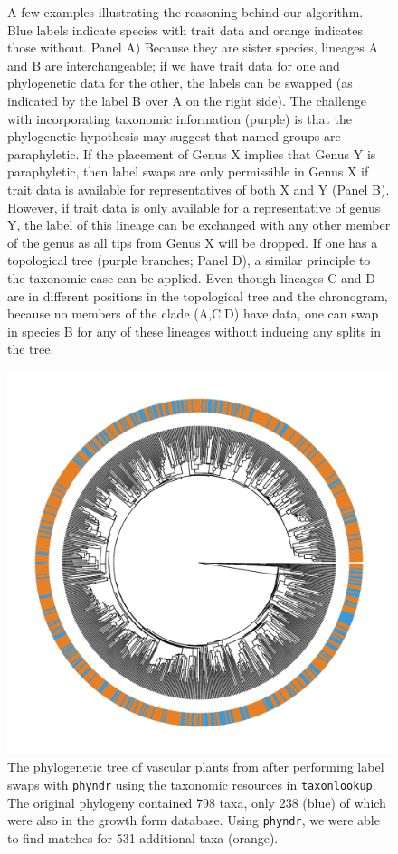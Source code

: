\documentclass[a4paper,11pt]{article}
\newcommand{\phyndr}{\tt phyndr}
\newcommand{\taxonlookup}{\tt taxonlookup}
\begin{document}
\addtocounter{figure}{-1}
\begin{figure} [p]
  \caption{A few examples illustrating the reasoning behind our algorithm. Blue labels indicate species with trait data and orange indicates those without. Panel A) Because they are sister species, lineages A and B are interchangeable; if we have trait data for one and phylogenetic data for the other, the labels can be swapped (as indicated by the label B over A on the right side). The challenge with incorporating taxonomic information (purple) is that the phylogenetic hypothesis may suggest that named groups are paraphyletic. If the placement of Genus X implies that Genus Y is paraphyletic, then label swaps are only permissible in Genus X if trait data is available for representatives of both X and Y (Panel B). However, if trait data is only available for a representative of genus Y, the label of this lineage can be exchanged with any other member of the genus as all tips from Genus X will be dropped. If one has a topological tree (purple branches; Panel D), a similar principle to the taxonomic case can be applied. Even though lineages C and D are in different positions in the topological tree and the chronogram, because no members of the clade (A,C,D) have data, one can swap in species B for any of these lineages without inducing any splits in the tree.}
\end{figure}

\begin{figure}[p]
\includegraphics[scale=0.75]{figs/tree-fig-temp}
\caption{The phylogenetic tree of vascular plants from \citet{Magallon2015} after performing label swaps with {\phyndr} using the taxonomic resources in {\taxonlookup}. The original phylogeny contained 798 taxa, only 238 (blue) of which were also in the growth form database. Using {\phyndr}, we were able to find matches for 531 additional taxa (orange).}
\label{fig:plant-tree}
\end{figure}
\end{document}
